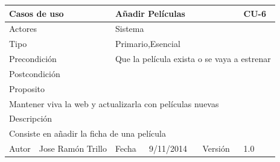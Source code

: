 \documentclass{article}
\begin{document}
\begin{table}[h]
\begin{tabular}{|l|l|l|l|l|l|}
\hline
\multicolumn{2}{|p{2cm}|}{Casos de uso}  & \multicolumn{3}{p{7cm}|}{\textbf{Añadir Películas}} & CU-6 \\
\hline
\multicolumn{2}{|p{2cm}|}{Actores}       & \multicolumn{4}{p{8cm}|}{Sistema}        \\
\hline
\multicolumn{2}{|p{2cm}|}{Tipo}          & \multicolumn{4}{p{8cm}|}{Primario,Esencial}        \\
\hline
\multicolumn{2}{|p{2cm}|}{Precondición}  & \multicolumn{4}{p{8cm}|}{Que la película exista o se vaya a estrenar}        \\
\hline
\multicolumn{2}{|p{2cm}|}{Postcondición} & \multicolumn{4}{p{8cm}|}{}        \\
\hline
\multicolumn{6}{|p{10cm}|}{Proposito}                                   \\
\hline
\multicolumn{6}{|p{10cm}|}{Mantener viva la web y actualizarla con películas nuevas}                                            \\
\hline
\multicolumn{6}{|p{10cm}|}{Descripción}                                 \\
\hline
\multicolumn{6}{|p{10cm}|}{Consiste en añadir la ficha de una película}                                            \\
\hline
Autor              &     Jose Ramón Trillo         & Fecha    &  9/11/2014   &   Versión  &1.0\\
\hline
\end{tabular}
\end{table}
\end{document}
